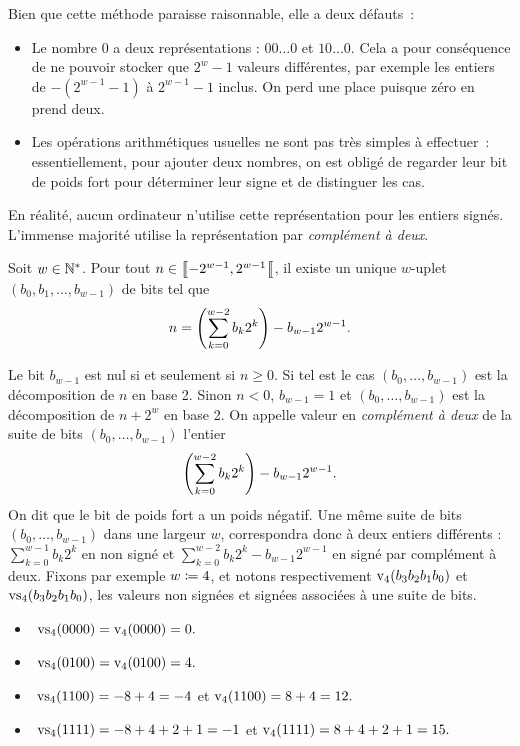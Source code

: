 \documentclass{magnolia}
\begin{document}
Bien que cette méthode paraisse raisonnable, elle a deux défauts~:
\begin{itemize}
  \item Le nombre 0 a deux représentations : $00\dots0$ et $10\dots0$. Cela a pour
  conséquence de ne pouvoir stocker que $2^w - 1$ valeurs différentes, par exemple les entiers
  de $-(2^{w-1} - 1)$ à $2^{w- 1} - 1$ inclus. On perd une place puisque zéro en prend deux.
  \item Les opérations arithmétiques usuelles ne sont pas très simples à effectuer~: essentiellement,
  pour ajouter deux nombres, on est obligé de regarder leur bit de poids fort pour déterminer
  leur signe et de distinguer les cas.
\end{itemize}

En réalité, aucun ordinateur n'utilise cette représentation pour les entiers signés.
L'immense majorité utilise la représentation par \emph{complément à deux}.

\begin{proposition}
Soit $w\in{\mathbb{N}^*}$. Pour tout $n\in\left\llbracket -2^{w-1},2^{w-1}\right\llbracket$, il existe un unique $w$-uplet
$(b_0,b_1,\ldots,b_{w-1})$ de bits tel que
\[n=\left(\sum_{k=0}^{w-2} b_k 2^k\right) - b_{w-1}2^{w-1}.\]
\end{proposition}

\begin{remarques}
\remarque Le bit $b_{w-1}$ est nul si et seulement si $n\geq 0$. Si tel est le cas
  $(b_0,\ldots,b_{w-1})$ est la décomposition de $n$ en base 2.
  Sinon $n<0$, $b_{w-1}=1$ et $(b_0,\ldots,b_{w-1})$ est la décomposition de
  $n + 2^w$ en base 2.
\remarque On appelle valeur en \emph{complément à deux} de la suite
de bits $(b_0, \ldots, b_{w-1})$ l'entier
\[\left(\sum_{k=0}^{w-2} b_k 2^k\right) - b_{w-1}2^{w-1}.\]
  On dit que le bit de poids fort a un poids négatif.
\remarque Une même suite de bits $(b_0, \ldots, b_{w-1})$ dans une 
  largeur $w$, correspondra donc à deux entiers différents :
  $\sum_{k = 0}^{w - 1}b_{k} 2^{k}$ en non signé et
  $\sum_{k = 0}^{w - 2}b_{k}2^{k} -b_{w - 1}2^{w - 1}$ en signé par
  complément à deux.
  Fixons par exemple
  $w \coloneqq 4$, et notons respectivement ${\rm v}_{4}(b_{3}b_{2}b_1 b_0)$ et ${\rm vs}_{4}(b_3 b_2 b_1 b_0)$, les
  valeurs non signées et signées associées à une suite de bits.
  \begin{itemize}
    \item $\ {\rm vs}_{4}(0000) = {\rm v}_{4}(0000) = 0.$
    \item $\ {\rm vs}_{4}(0100) = {\rm v}_{4}(0100) = 4.$
    \item $\ {\rm vs}_{4}(1100) = -8 + 4 = -4$ et ${\rm v}_{4}(1100) = 8 + 4 = 12.$
    \item $\ {\rm vs}_{4}(1111) = -8 + 4 + 2 + 1 = -1$ et ${\rm v}_{4}(1111) = 8 + 4 + 2 + 1 = 15.$
  \end{itemize}
\end{remarques}
\end{document}
